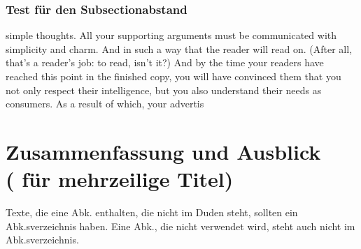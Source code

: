 \documentclass{like}
\begin{document}
\subsection{Test für den Subsectionabstand}
simple thoughts. All your supporting arguments must be communicated with simplicity and charm. And in such a way that the reader will read on. (After all, that’s a reader’s job: to read, isn’t it?) And by the time your readers have reached this point in the finished copy, you will have convinced them that you not only respect their intelligence, but you also understand their needs as consumers. As a result of which, your advertis

\chapter[Zusammenfassung]{Zusammenfassung und Ausblick \\\hspace{5mm}( für mehrzeilige Titel)}
Texte, die eine \ac{Abk.} enthalten, die nicht im Duden steht, sollten ein \acl{Abk.}sverzeichnis haben. Eine \ac{Abk.}, die nicht verwendet wird, steht auch nicht im \acl{Abk.}sverzeichnis.



\appendix





%



%


\end{document}
